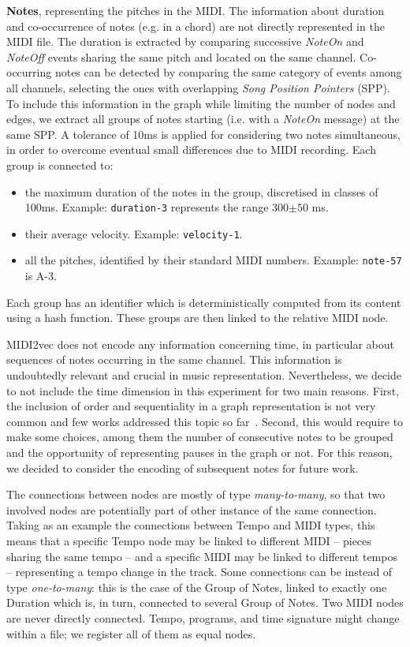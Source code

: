 \documentclass{article}
\begin{document}
\textbf{Notes}, representing the pitches in the MIDI. The information about duration and co-occurrence of notes (e.g. in a chord) are not directly represented in the MIDI file. The duration is extracted by comparing successive \textit{NoteOn} and \textit{NoteOff} events sharing the same pitch and located on the same channel. Co-occurring notes can be detected by comparing the same category of events among all channels, selecting the ones with overlapping \textit{Song Position Pointers} (SPP). To include this information in the graph while limiting the number of nodes and edges, we extract all groups of notes starting (i.e. with a \textit{NoteOn} message) at the same SPP. A tolerance of 10ms is applied for considering two notes simultaneous, in order to overcome eventual small differences due to MIDI recording. Each group is connected to:
\begin{itemize}
    \item the maximum duration of the notes in the group, discretised in classes of 100ms. Example: \texttt{duration-3} represents the range 300$\pm50$ ms.
    \item their average velocity. Example: \texttt{velocity-1}.
    \item all the pitches, identified by their standard MIDI numbers. Example: \texttt{note-57} is A-3.
\end{itemize}
Each group has an identifier which is deterministically computed from its content using a hash function. These groups are then linked to the relative MIDI node.

MIDI2vec does not encode any information concerning time, in particular about sequences of notes occurring in the same channel. This information is undoubtedly relevant and crucial in music representation. Nevertheless, we decide to not include the time dimension in this experiment for two main reasons. First, the inclusion of order and sequentiality in a graph representation is not very common and few works addressed this topic so far~\citep{ranjan2016sequence,singer2019temporalgraphs}. Second, this would require to make some choices, among them the number of consecutive notes to be grouped and the opportunity of representing pauses in the graph or not. For this reason, we decided to consider the encoding of subsequent notes for future work.

The connections between nodes are mostly of type \textit{many-to-many}, so that two involved nodes are potentially part of other instance of the same connection. Taking as an example the connections between Tempo and MIDI types, this means that a specific Tempo node may be linked to different MIDI -- pieces sharing the same tempo -- and a specific MIDI may be linked to different tempos -- representing a tempo change in the track. Some connections can be instead of type \textit{one-to-many}: this is the case of the Group of Notes, linked to exactly one Duration which is, in turn, connected to several Group of Notes. Two MIDI nodes are never directly connected. Tempo, programs, and time signature might change within a file; we register all of them as equal nodes.
\end{document}
